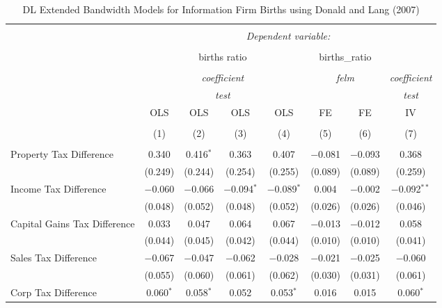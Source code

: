 
\begin{table}[!htbp] \centering 
  \caption{DL Extended Bandwidth Models for  Information Firm Births using Donald and Lang (2007)} 
  \label{} 
\begin{tabular}{@{\extracolsep{5pt}}lccccccc} 
\\[-1.8ex]\hline 
\hline \\[-1.8ex] 
 & \multicolumn{7}{c}{\textit{Dependent variable:}} \\ 
\cline{2-8} 
\\[-1.8ex] & \multicolumn{4}{c}{births ratio} & \multicolumn{2}{c}{births\_ratio} &   \\ 
\\[-1.8ex] & \multicolumn{4}{c}{\textit{coefficient}} & \multicolumn{2}{c}{\textit{felm}} & \textit{coefficient} \\ 
 & \multicolumn{4}{c}{\textit{test}} & \multicolumn{2}{c}{\textit{}} & \textit{test} \\ 
 & OLS & OLS & OLS & OLS & FE & FE & IV \\ 
\\[-1.8ex] & (1) & (2) & (3) & (4) & (5) & (6) & (7)\\ 
\hline \\[-1.8ex] 
 Property Tax Difference & 0.340 & 0.416$^{*}$ & 0.363 & 0.407 & $-$0.081 & $-$0.093 & 0.368 \\ 
  & (0.249) & (0.244) & (0.254) & (0.255) & (0.089) & (0.089) & (0.259) \\ 
  Income Tax Difference & $-$0.060 & $-$0.066 & $-$0.094$^{*}$ & $-$0.089$^{*}$ & 0.004 & $-$0.002 & $-$0.092$^{**}$ \\ 
  & (0.048) & (0.052) & (0.048) & (0.052) & (0.026) & (0.026) & (0.046) \\ 
  Capital Gains Tax Difference & 0.033 & 0.047 & 0.064 & 0.067 & $-$0.013 & $-$0.012 & 0.058 \\ 
  & (0.044) & (0.045) & (0.042) & (0.044) & (0.010) & (0.010) & (0.041) \\ 
  Sales Tax Difference & $-$0.067 & $-$0.047 & $-$0.062 & $-$0.028 & $-$0.021 & $-$0.025 & $-$0.060 \\ 
  & (0.055) & (0.060) & (0.061) & (0.062) & (0.030) & (0.031) & (0.061) \\ 
  Corp Tax Difference & 0.060$^{*}$ & 0.058$^{*}$ & 0.052 & 0.053$^{*}$ & 0.016 & 0.015 & 0.060$^{*}$ \\ 

\end{tabular}
\end{table}
